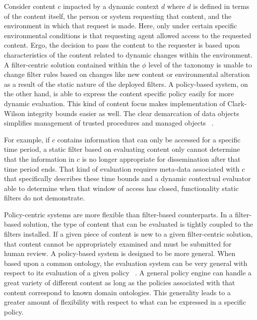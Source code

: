 Consider content $c$ impacted by a dynamic context $d$ where $d$ is defined in terms of the content itself, the person or system requesting that content, and the environment in which that request is made.  Here, only under certain specific environmental conditions is that requesting agent allowed access to the requested content.  Ergo, the decision to pass the content to the requester is based upon characteristics of the content related to dynamic changes within the environment.  A filter-centric solution contained within the $\phi$ level of the taxonomy is unable to change filter rules based on changes like new content or environmental alteration as a result of the static nature of the deployed filters.  A policy-based system, on the other hand, is able to express the content specific policy easily for more dynamic evaluation.  This kind of content focus makes implementation of Clark-Wilson integrity bounds easier as well.  The clear demarcation of data objects simplifies management of trusted procedures and managed objects ~\cite{ClaWil87}.

For example, if $c$ contains information that can only be accessed for a specific time period, a static filter based on evaluating content only cannot determine that the information in $c$ is no longer appropriate for dissemination after that time period ends.  That kind of evaluation requires meta-data associated with $c$ that specifically describes these time bounds and a dynamic contextual evaluator able to determine when that window of access has closed, functionality static filters do not demonstrate.

Policy-centric systems are more flexible than filter-based counterparts.  In a filter-based solution, the type of content that can be evaluated is tightly coupled to the filters installed.  If a given piece of content is new to a given filter-centric solution, that content cannot be appropriately examined and must be submitted for human review.  A policy-based system is designed to be more general.  When based upon a common ontology, the evaluation system can be very general with respect to its evaluation of a given policy ~\cite{JaHeLa:10}.  A general policy engine can handle a great variety of different content as long as the policies associated with that content correspond to known domain ontologies.  This generality leads to a greater amount of flexibility with respect to what can be expressed in a specific policy.

